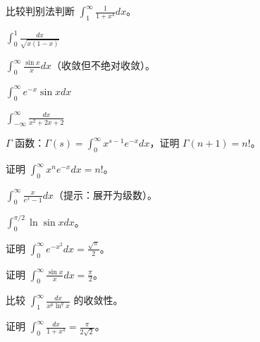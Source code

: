 \begin{exercise}[4] 比较判别法判断 \(\int_1^\infty \frac{1}{1+x^4} dx\)。\end{exercise}
\begin{exercise}[4] \(\int_0^1 \frac{dx}{\sqrt{x(1-x)}}\)\end{exercise}
\begin{exercise}[4] \(\int_0^\infty \frac{\sin x}{x} dx\)（收敛但不绝对收敛）。\end{exercise}
\begin{exercise}[4] \(\int_0^\infty e^{-x}\sin x dx\)\end{exercise}
\begin{exercise}[4] \(\int_{-\infty}^\infty \frac{dx}{x^2+2x+2}\)\end{exercise}
\begin{exercise}[5] \(\Gamma\) 函数：\(\Gamma(s)=\int_0^\infty x^{s-1}e^{-x}dx\)，证明 \(\Gamma(n+1)=n!\)。\end{exercise}
\begin{exercise}[5] 证明 \(\int_0^\infty x^n e^{-x}dx = n!\)。\end{exercise}
\begin{exercise}[5] \(\int_0^\infty \frac{x}{e^x-1} dx\)（提示：展开为级数）。\end{exercise}
\begin{exercise}[5] \(\int_0^{\pi/2} \ln\sin x dx\)。\end{exercise}
\begin{exercise}[6] 证明 \(\int_0^\infty e^{-x^2}dx = \frac{\sqrt{\pi}}{2}\)。\end{exercise}
\begin{exercise}[6] 证明 \(\int_0^\infty \frac{\sin x}{x}dx = \frac{\pi}{2}\)。\end{exercise}
\begin{exercise}[6] 比较 \(\int_1^\infty \frac{dx}{x^p\ln^q x}\) 的收敛性。\end{exercise}
\begin{exercise}[7] 证明 \(\int_0^\infty \frac{dx}{1+x^4} = \frac{\pi}{2\sqrt{2}}\)。\end{exercise}
